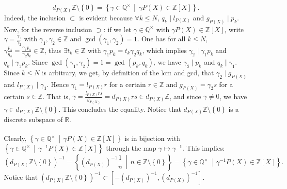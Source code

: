 \documentclass[11pt, a4paper, oneside]{article}
\theoremstyle{remark}
\theoremstyle{lemma}
\begin{document}
\begin{equation}
\tag{1}
\label{5.1}
d_{P(X)} \mathbb{Z} \setminus \left\{ 0 \right\} = \left\{ \gamma \in \mathbb{Q}^{\times} \,\middle|\, \gamma P(X) \in \mathbb{Z}[X] \right\}.
\end{equation}
Indeed, the inclusion \( \subset \) is evident because \( \forall k \leq N,\, q_k \mid l_{P(X)} \) and \( g_{P(X)} \mid p_k \). Now, for the reverse inclusion \( \supset \): if we let \( \gamma \in \mathbb{Q}^{\times} \) with \( \gamma P(X) \in \mathbb{Z}[X] \), write \( \gamma = \frac{\gamma_1}{\gamma_2} \) with \( \gamma_1, \gamma_2 \in \mathbb{Z} \) and \( \gcd(\gamma_1, \gamma_2) = 1 \). One has for all \( k \leq N \), \( \gamma \frac{p_k}{q_k} = \frac{\gamma_1 p_k}{\gamma_2 q_k} \in \mathbb{Z} \), thus \( \exists t_k \in \mathbb{Z} \) with \( \gamma_1 p_k = t_k \gamma_2 q_k \), which implies \( \gamma_2 \mid \gamma_1 p_k \) and \( q_k \mid \gamma_1 p_k \). Since \( \gcd(\gamma_1, \gamma_2) = 1 = \gcd(p_k, q_k) \), we have \( \gamma_2 \mid p_k \) and \( q_k \mid \gamma_1 \). Since \( k \leq N \) is arbitrary, we get, by definition of the lcm and gcd, that \( \gamma_2 \mid g_{P(X)} \) and \( l_{P(X)} \mid \gamma_1 \). Hence \( \gamma_1 = l_{P(X)} r \) for a certain \( r \in \mathbb{Z} \) and \( g_{P(X)} = \gamma_2 s \) for a certain \( s \in \mathbb{Z} \). That is, \( \gamma = \frac{l_{P(X)} r s}{g_{P(X)}} = d_{P(X)} r s \in d_{P(X)} \mathbb{Z} \), and since \( \gamma \neq 0 \), we have \( \gamma \in d_{P(X)} \mathbb{Z} \setminus \left\{ 0 \right\} \). This concludes the equality. Notice that \(d_{P(X)} \mathbb{Z} \setminus \left\{ 0 \right\}\) is a discrete subspace of \(\mathbb{R}\).
\\\\
Clearly, \( \left\{ \gamma \in \mathbb{Q}^{\times} \,\middle|\, \gamma P(X) \in \mathbb{Z}[X] \right\} \) is in bijection with \( \left\{ \gamma \in \mathbb{Q}^{\times} \,\middle|\, \gamma^{-1} P(X) \in \mathbb{Z}[X] \right\} \) through the map \( \gamma \mapsto \gamma^{-1} \). This implies:
\begin{equation}
\tag{2}
\label{5.2}
\left(d_{P(X)} \mathbb{Z} \setminus \left\{ 0 \right\}\right)^{-1} = \left\{\left(d_{P(X)}\right)^{-1}\frac{1}{n} \,\middle|\, n \in \mathbb{Z} \setminus \left\{ 0 \right\} \right\} = \left\{ \gamma \in \mathbb{Q}^{\times} \,\middle|\, \gamma^{-1} P(X) \in \mathbb{Z}[X] \right\}.
\end{equation}
Notice that \(\left(d_{P(X)} \mathbb{Z} \setminus \left\{ 0 \right\}\right)^{-1} \subset \left[-\left(d_{P(X)}\right)^{-1}, \left(d_{P(X)}\right)^{-1}\right]\).
\end{document}
